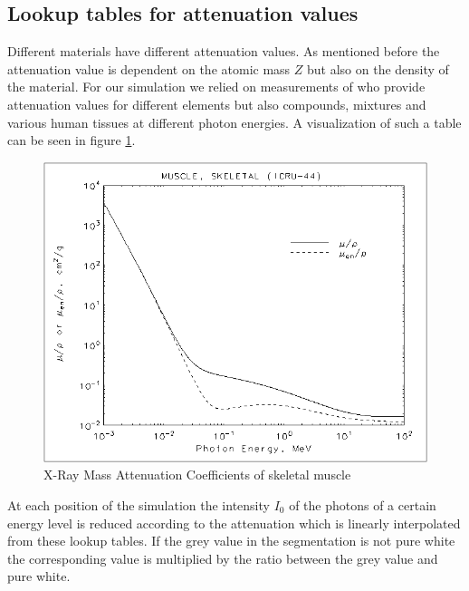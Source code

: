 \subsection{Lookup tables for attenuation values}
\par Different materials have different attenuation values. As mentioned before the attenuation value is dependent on the atomic mass \(Z\) but also on the density of the material. For our simulation we relied on measurements of \cite{AttenuationTable} who provide attenuation values for different elements but also compounds, mixtures and various human tissues at different photon energies. A visualization of such a table can be seen in figure \ref{muscleAtt}.
\begin{figure}[h!]
	\centering
	\includegraphics[width=0.5\linewidth]{images/muscle.png}
	\caption{X-Ray Mass Attenuation Coefficients of skeletal muscle\cite{AttenuationTable}}
	\label{muscleAtt}
\end{figure}
\par At each position of the simulation the intensity \(I_{0}\) of the photons of a certain energy level is reduced according to the attenuation which is linearly interpolated from these lookup tables. If the grey value in the segmentation is not pure white the corresponding value is multiplied by the ratio between the grey value and pure white.
